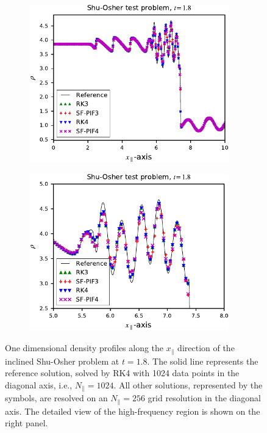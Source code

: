 \begin{figure}
    \centering
    \begin{subfigure}{70mm}
        \centering
        \includegraphics[width=0.95\textwidth]{fig/shu45_weno5_256}
    \end{subfigure}
    \begin{subfigure}{70mm}
        \centering
        \includegraphics[width=0.95\textwidth]{fig/shu45_weno5_256_zoomed}
    \end{subfigure}
    \caption{One dimensional density profiles along the \( x_{\parallel} \) direction 
        of the inclined Shu-Osher problem at \( t = 1.8 \).
        The solid line represents the reference solution,
        solved by RK4 with 1024 data points
        in the diagonal axis, i.e., \( N_{\parallel} = 1024 \).
        All other solutions, represented by the symbols, are resolved on an
        \( N_{\parallel} = 256 \) grid resolution in the diagonal axis.
        The detailed view of the high-frequency region is shown
        on the right panel.
    }\label{fig:shu45}
\end{figure}


